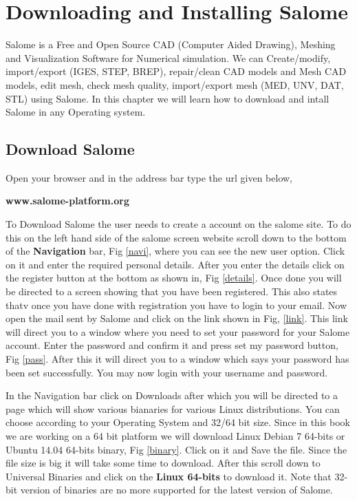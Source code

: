 \chapter{Downloading and Installing Salome}
\thispagestyle{empty}
\label{sec:chap5}
\newcommand{\LocCHfivefig}{\Origin/CHAPTERS/chap5/figures}

Salome is a Free and Open Source  CAD (Computer Aided Drawing), Meshing and Visualization Software for Numerical simulation. 
We can Create/modify, import/export (IGES, STEP, BREP), repair/clean CAD models and Mesh CAD models, edit mesh, check mesh quality, 
import/export mesh (MED, UNV, DAT, STL) using Salome. In this chapter we will learn how to download and intall Salome in any Operating system.

\section{Download Salome}

Open your browser and in the address bar type the url given below, \newline

\centering \textbf{www.salome-platform.org} \newline

\flushleft To Download Salome the user needs to create a account on the salome site. To do this on the left hand side of the salome screen website
scroll down to the bottom of the \textbf{Navigation} bar, Fig \ref{navi}, where you can see the new user option. Click on it and enter the required
personal details. \newline
\flushleft After you enter the details click on the register button at the bottom as shown in, Fig \ref{details}. Once done you will be directed 
to a screen showing that you have been registered. This also states thatv once you have done with registration you have to login to your email. Now 
open the mail sent by Salome and click on the link shown in Fig, \ref{link}. This link will direct you to a window where you need to set your password
for your Salome account. Enter the password and confirm it and press set my password button, Fig \ref{pass}. After this it will direct you to a window
which says your password has been set successfully. You may now login with your username and password. \newline

\flushleft In the Navigation bar click on Downloads after which you will be directed to a page which will show various bianaries for various Linux
distributions. You can choose according to your Operating System and 32/64 bit size. Since in this book we are working on a 64 bit platform we
will download Linux Debian 7 64-bits or Ubuntu 14.04 64-bits binary, Fig \ref{binary}. Click on it and Save the file. Since the file size is big it will take some time to download.
After this scroll down to Universal Binaries and click on the \textbf{Linux 64-bits} to download it. Note that 32-bit version of binaries are no
more supported for the latest version of Salome.

